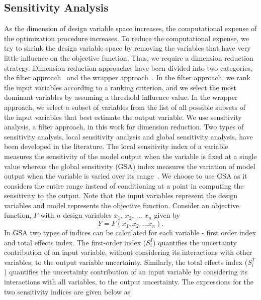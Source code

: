 \documentclass[10pt]{article}
\begin{document}
\subsection{Sensitivity Analysis}
\label{subsec:Sensitivity}
As the dimension of design variable space increases, the computational expense of the optimization procedure increases. To reduce the computational expense, we try to shrink the design variable space by removing the variables that have very little influence on the objective function. Thus, we require a dimension reduction strategy. Dimension reduction approaches have been divided into two categories, the filter approach~\cite{Bioinformatics} and the wrapper approach~\cite{Wrappers}. In the filter approach, we rank the input variables according to a ranking criterion, and we select the most dominant variables by assuming a threshold influence value. In the wrapper approach, we select a subset of variables from the list of all possible subsets of the input variables that best estimate the output variable. We use sensitivity analysis, a filter approach, in this work for dimension reduction. Two types of sensitivity analysis, local sensitivity analysis and global sensitivity analysis, have been developed in the literature. The local sensitivity index of a variable measures the sensitivity of the model output when the variable is fixed at a single value whereas the global sensitivity (GSA) index measures the variation of model output when the variable is varied over its range~\cite{Global}. We choose to use GSA as it considers the entire range instead of conditioning at a point in computing the sensitivity to the output. Note that the input variables represent the design variables and model represents the objective function.
Consider an objective function, $F$ with $n$ design variables $x_{1}$, $x_{2}$, ...  $x_{n}$ given by
\begin{equation}
Y = F(x_{1}, x_{2}, ... x_{n}).
\end{equation}
In GSA two types of indices can be calculated for each variable - first order index and total effects index. The first-order index ($S_{i}^{I}$) quantifies the uncertainty contribution of an input variable, without considering its interactions with other variables, to the output variable uncertainty. Similarly, the total effects index ($S_{i}^{T}$) quantifies the uncertainty contribution of an input variable by considering its interactions with all variables, to the output uncertainty. The expressions for the two sensitivity indices are given below as 
\end{document}
